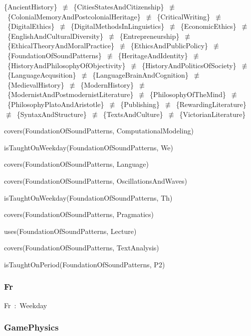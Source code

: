 \documentclass{article}
\begin{document}
\{AncientHistory\}~\ensuremath{\not\equiv}~\{CitiesStatesAndCitizenship\}~\ensuremath{\not\equiv}~\{ColonialMemoryAndPostcolonialHeritage\}~\ensuremath{\not\equiv}~\{CriticalWriting\}~\ensuremath{\not\equiv}~\{DigitalEthics\}~\ensuremath{\not\equiv}~\{DigitalMethodsInLinguistics\}~\ensuremath{\not\equiv}~\{EconomicEthics\}~\ensuremath{\not\equiv}~\{EnglishAndCulturalDiversity\}~\ensuremath{\not\equiv}~\{Entrepreneurship\}~\ensuremath{\not\equiv}~\{EthicalTheoryAndMoralPractice\}~\ensuremath{\not\equiv}~\{EthicsAndPublicPolicy\}~\ensuremath{\not\equiv}~\{FoundationOfSoundPatterns\}~\ensuremath{\not\equiv}~\{HeritageAndIdentity\}~\ensuremath{\not\equiv}~\{HistoryAndPhilosophyOfObjectivity\}~\ensuremath{\not\equiv}~\{HistoryAndPoliticsOfSociety\}~\ensuremath{\not\equiv}~\{LanguageAcqusition\}~\ensuremath{\not\equiv}~\{LanguageBrainAndCognition\}~\ensuremath{\not\equiv}~\{MedievalHistory\}~\ensuremath{\not\equiv}~\{ModernHistory\}~\ensuremath{\not\equiv}~\{ModernistAndPostmodernistLiterature\}~\ensuremath{\not\equiv}~\{PhilosophyOfTheMind\}~\ensuremath{\not\equiv}~\{PhilosophyPlatoAndAristotle\}~\ensuremath{\not\equiv}~\{Publishing\}~\ensuremath{\not\equiv}~\{RewardingLiterature\}~\ensuremath{\not\equiv}~\{SyntaxAndStructure\}~\ensuremath{\not\equiv}~\{TextsAndCulture\}~\ensuremath{\not\equiv}~\{VictorianLiterature\}

covers(FoundationOfSoundPatterns, ComputationalModeling)

isTaughtOnWeekday(FoundationOfSoundPatterns, We)

covers(FoundationOfSoundPatterns, Language)

covers(FoundationOfSoundPatterns, OscillationsAndWaves)

isTaughtOnWeekday(FoundationOfSoundPatterns, Th)

covers(FoundationOfSoundPatterns, Pragmatics)

uses(FoundationOfSoundPatterns, Lecture)

covers(FoundationOfSoundPatterns, TextAnalysis)

isTaughtOnPeriod(FoundationOfSoundPatterns, P2)

\subsubsection*{Fr}

Fr~:~Weekday

\subsubsection*{GamePhysics}
\end{document}
